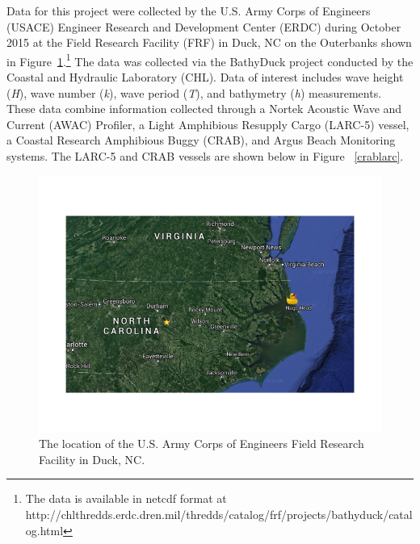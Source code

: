 Data for this project were collected by the U.S. Army Corps of Engineers (USACE) Engineer Research and Development Center (ERDC) during October 2015 at the Field Research Facility (FRF) in Duck, NC on the Outerbanks shown in Figure~\ref{FRFmap}.\footnote{The data is available in netcdf format at http://chlthredds.erdc.dren.mil/thredds/catalog/frf/projects/bathyduck/catalog.html} The data was collected via the BathyDuck project conducted by the Coastal and Hydraulic Laboratory (CHL). Data of interest includes wave height (\textit{H}), wave number (\textit{k}), wave period (\textit{T}), and bathymetry (\textit{h}) measurements. These data combine information collected through a Nortek Acoustic Wave and Current (AWAC) Profiler, a Light Amphibious Resupply Cargo (LARC-5) vessel, a Coastal Research Amphibious Buggy (CRAB), and Argus Beach Monitoring systems. The LARC-5 and CRAB vessels are shown below in Figure ~\ref{crablarc}.

\begin{figure}[h]
\centering
\includegraphics[width=7\linewidth]{img/FRF_map.png}
\caption{The location of the U.S. Army Corps of Engineers Field Research Facility in Duck, NC.}
\label{FRFmap}
\end{figure}

